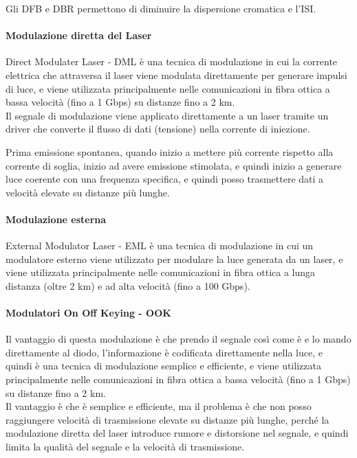 Gli DFB e DBR permettono di diminuire la dispersione cromatica e l'ISI.

\paragraph{Modulazione diretta del Laser}

Direct Modulater Laser - DML è una tecnica di modulazione in cui la corrente elettrica che attraversa il laser viene modulata direttamente per generare impulsi di luce, 
e viene utilizzata principalmente nelle comunicazioni in fibra ottica a bassa velocità (fino a 1 Gbps) su distanze fino a 2 km.\\

Il segnale di modulazione viene applicato direttamente a un laser tramite un driver che converte il flusso di dati (tensione) nella corrente di iniezione.

Prima emissione spontanea, quando inizio a mettere più corrente rispetto alla corrente di soglia, inizio ad avere emissione stimolata, e quindi inizio a generare luce coerente 
con una frequenza specifica, e quindi posso trasmettere dati a velocità elevate su distanze più lunghe.\\

\paragraph{Modulazione esterna}
External Modulator Laser - EML è una tecnica di modulazione in cui un modulatore esterno viene utilizzato per modulare la luce generata da un laser, e viene utilizzata principalmente nelle comunicazioni in fibra ottica a lunga distanza (oltre 2 km) e ad alta velocità (fino a 100 Gbps).\\

\paragraph{Modulatori On Off Keying - OOK}

Il vantaggio di questa modulazione è che prendo il segnale così come è e lo mando direttamente al diodo, l'informazione è codificata direttamente nella luce, e quindi è una tecnica di modulazione semplice e efficiente, e viene utilizzata principalmente nelle comunicazioni in fibra ottica a bassa velocità (fino a 1 Gbps) su distanze fino a 2 km.\\
Il vantaggio è che è semplice e efficiente, ma il problema è che non posso raggiungere velocità di trasmissione elevate su distanze più lunghe, perché la modulazione diretta del laser introduce rumore e distorsione nel segnale, e quindi limita la qualità del segnale e la velocità di trasmissione.\\

